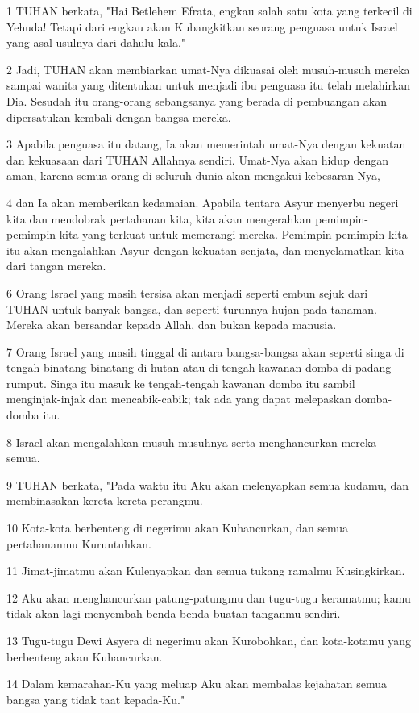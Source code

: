 \par 1 TUHAN berkata, "Hai Betlehem Efrata, engkau salah satu kota yang terkecil di Yehuda! Tetapi dari engkau akan Kubangkitkan seorang penguasa untuk Israel yang asal usulnya dari dahulu kala."
\par 2 Jadi, TUHAN akan membiarkan umat-Nya dikuasai oleh musuh-musuh mereka sampai wanita yang ditentukan untuk menjadi ibu penguasa itu telah melahirkan Dia. Sesudah itu orang-orang sebangsanya yang berada di pembuangan akan dipersatukan kembali dengan bangsa mereka.
\par 3 Apabila penguasa itu datang, Ia akan memerintah umat-Nya dengan kekuatan dan kekuasaan dari TUHAN Allahnya sendiri. Umat-Nya akan hidup dengan aman, karena semua orang di seluruh dunia akan mengakui kebesaran-Nya,
\par 4 dan Ia akan memberikan kedamaian. Apabila tentara Asyur menyerbu negeri kita dan mendobrak pertahanan kita, kita akan mengerahkan pemimpin-pemimpin kita yang terkuat untuk memerangi mereka. Pemimpin-pemimpin kita itu akan mengalahkan Asyur dengan kekuatan senjata, dan menyelamatkan kita dari tangan mereka.
\par 6 Orang Israel yang masih tersisa akan menjadi seperti embun sejuk dari TUHAN untuk banyak bangsa, dan seperti turunnya hujan pada tanaman. Mereka akan bersandar kepada Allah, dan bukan kepada manusia.
\par 7 Orang Israel yang masih tinggal di antara bangsa-bangsa akan seperti singa di tengah binatang-binatang di hutan atau di tengah kawanan domba di padang rumput. Singa itu masuk ke tengah-tengah kawanan domba itu sambil menginjak-injak dan mencabik-cabik; tak ada yang dapat melepaskan domba-domba itu.
\par 8 Israel akan mengalahkan musuh-musuhnya serta menghancurkan mereka semua.
\par 9 TUHAN berkata, "Pada waktu itu Aku akan melenyapkan semua kudamu, dan membinasakan kereta-kereta perangmu.
\par 10 Kota-kota berbenteng di negerimu akan Kuhancurkan, dan semua pertahananmu Kuruntuhkan.
\par 11 Jimat-jimatmu akan Kulenyapkan dan semua tukang ramalmu Kusingkirkan.
\par 12 Aku akan menghancurkan patung-patungmu dan tugu-tugu keramatmu; kamu tidak akan lagi menyembah benda-benda buatan tanganmu sendiri.
\par 13 Tugu-tugu Dewi Asyera di negerimu akan Kurobohkan, dan kota-kotamu yang berbenteng akan Kuhancurkan.
\par 14 Dalam kemarahan-Ku yang meluap Aku akan membalas kejahatan semua bangsa yang tidak taat kepada-Ku."

